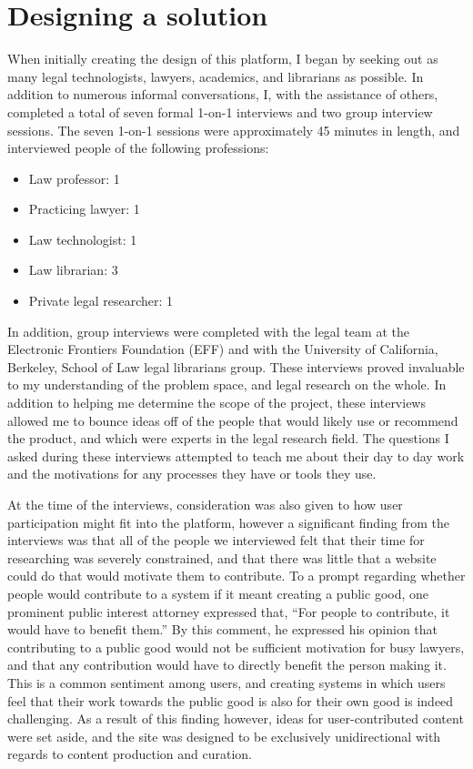 \label{solutiondesign}
\section{Designing a solution}
When initially creating the design of this platform, I began by seeking out as many legal technologists, lawyers, academics, and librarians as possible. In addition to numerous informal conversations, I, with the assistance of others, completed a total of seven formal 1-on-1 interviews and two group interview sessions. The seven 1-on-1 sessions were approximately 45 minutes in length, and interviewed people of the following professions:
\begin{itemize}
\item Law professor: 1 
\item Practicing lawyer: 1
\item Law technologist: 1
\item Law librarian: 3
\item Private legal researcher: 1
\end{itemize}
In addition, group interviews were completed with the legal team at the Electronic Frontiers Foundation (EFF) and with the University of California, Berkeley, School of Law legal librarians group. These interviews proved invaluable to my understanding of the problem space, and legal research on the whole. In addition to helping me determine the scope of the project, these interviews allowed me to bounce ideas off of the people that would likely use or recommend the product, and which were experts in the legal research field. The questions I asked during these interviews attempted to teach me about their day to day work and the motivations for any processes they have or tools they use. 

At the time of the interviews, consideration was also given to how user participation might fit into the platform, however a significant finding from the interviews was that all of the people we interviewed felt that their time for researching was severely constrained, and that there was little that a website could do that would motivate them to contribute. To a prompt regarding whether people would contribute to a system if it meant creating a public good, one prominent public interest attorney expressed that, ``For people to contribute, it would have to benefit them.'' By this comment, he expressed his opinion that contributing to a public good would not be sufficient motivation for busy lawyers, and that any contribution would have to directly benefit the person making it. This is a common sentiment among users, and creating systems in which users feel that their work towards the public good is also for their own good is indeed challenging. As a result of this finding however, ideas for user-contributed content were set aside, and the site was designed to be exclusively unidirectional with regards to content production and curation.

